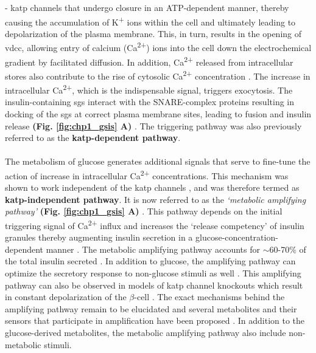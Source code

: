 - \gls{katp} channels that undergo closure in an ATP-dependent manner, thereby causing the accumulation of K\textsuperscript{+} ions within the cell and ultimately leading to depolarization of the plasma membrane. This, in turn, results in the opening of \gls{vdcc}, allowing entry of calcium (Ca\textsuperscript{2+}) ions into the cell down the electrochemical gradient by facilitated diffusion. In addition, Ca\textsuperscript{2+} released from intracellular stores also contribute to the rise of cytosolic Ca\textsuperscript{2+} concentration \textbf{\cite{yang_ionic_2014}}. The increase in intracellular Ca\textsuperscript{2+}, which is the indispensable signal, triggers exocytosis. The insulin-containing \glspl{sg} interact with the SNARE-complex proteins resulting in docking of the \glspl{sg} at correct plasma membrane sites, leading to fusion and insulin release \textbf{(Fig. \ref{fig:chp1_gsis} A)} \textbf{\cite{jewell_exocytosis_2010,chatterjee_bhowmick_conventional_2021}}.   %
The triggering pathway was also previously referred to as the \textbf{ \gls{katp}-dependent pathway}.
\\\\
The metabolism of glucose generates additional signals that serve to fine-tune the action of increase in intracellular Ca\textsuperscript{2+} concentrations. This mechanism was shown to work independent of the \gls{katp} channels \textbf{\cite{sato_dual_1992,gembal_evidence_1992}}, and was therefore termed as \textbf{\gls{katp}-independent pathway}. It is now referred to as the \textit{`metabolic amplifying pathway'} \textbf{(Fig. \ref{fig:chp1_gsis} A)} \textbf{\cite{henquin_triggering_2000,henquin_pathways_2004,henquin_regulation_2009}}.  This pathway depends on the initial triggering signal of Ca\textsuperscript{2+} influx and increases the `release competency' of insulin granules thereby augmenting insulin secretion in a glucose-concentration-dependent manner \textbf{\cite{henquin_triggering_2000,kalwat_mechanisms_2017}}. The metabolic amplifying pathway accounts for $\sim$60-70\% of the total insulin secreted \textbf{\cite{henquin_regulation_2009}}. In addition to glucose, the amplifying pathway can optimize the secretory response to non-glucose stimuli as well \textbf{\cite{henquin_triggering_2000,kalwat_mechanisms_2017,zhao_-hydrolase_2015,tengholm_camp_2017,han_glutamate_2021}}. This amplifying pathway can also be observed in models of \gls{katp} channel knockouts which result in constant depolarization of the $\beta$-cell \textbf{\cite{nenquin_both_2004,miki_defective_1998,ravier_glucose_2009}}. The exact mechanisms behind the amplifying pathway remain to be elucidated and several metabolites and their sensors that participate in amplification have been proposed \textbf{\cite{kalwat_mechanisms_2017}}. In addition to the glucose-derived metabolites, the metabolic amplifying pathway also include non-metabolic stimuli. 
